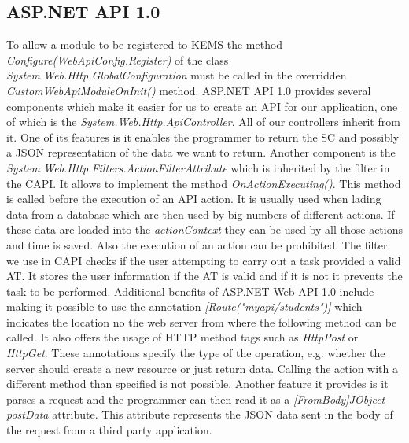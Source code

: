 \subsection{ASP.NET API 1.0}
\label{API1.0} To allow a module to be registered to KEMS the method \textit{Configure(WebApiConfig.Register)} of the class \textit{System.Web.Http.GlobalConfiguration} must be called in the overridden \textit{CustomWebApiModuleOnInit()} method. ASP.NET API 1.0 provides several components which make it easier for us to create an API for our application, one of which is the \textit{System.Web.Http.ApiController}. All of our controllers inherit from it. One of its features is it enables the programmer to return the SC and possibly a JSON representation of the data we want to return. Another component is the \textit{System.Web.Http.Filters.ActionFilterAttribute} which is inherited by the filter in the CAPI. It allows to implement the method \textit{OnActionExecuting()}. This method is called before the execution of an API action. It is usually used when lading data from a database which are then used by big numbers of different actions. If these data are loaded into the \textit{actionContext} they can be used by all those actions and time is saved. Also the execution of an action can be prohibited. The filter we use in CAPI checks if the user attempting to carry out a task provided a valid AT. It stores the user information if the AT is valid and if it is not it prevents the task to be performed. Additional benefits of ASP.NET Web API 1.0 include making it possible to use the annotation \textit{[Route("myapi/students")]} which indicates the location no the web server from where the following method can be called. It also offers the usage of HTTP method tags such as \textit{HttpPost} or \textit{HttpGet}. These annotations specify the type of the operation, e.g. whether the server should create a new resource or just return data. Calling the action with a different method than specified is not possible. Another feature it provides is it parses a request and the programmer can then read it as a \textit{[FromBody]JObject postData} attribute. This attribute represents the JSON data sent in the body of the request from a third party application. 

